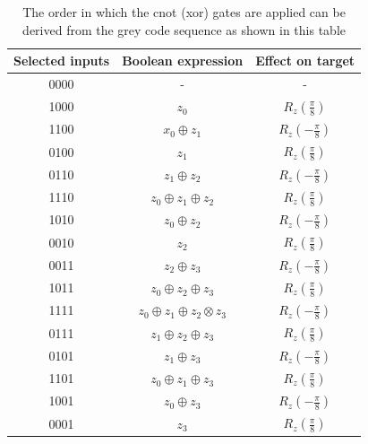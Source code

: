 \documentclass[12pt,a4paper]{article}
\begin{document}
\begin{table}[htbp]
\caption{The order in which the cnot (xor) gates are applied can be derived from the grey code sequence as shown in this table}
\label{table:grey_code_truth}
\begin{center}
\begin{tabular}{|c|c|c|} 
 \hline
 Selected inputs & Boolean expression & Effect on target \\  
 \hline
 0000 & - & - \\ 
 \hline
 1000 & \(z_0\) & \(R_z(\frac{\pi}{8})\) \\
 \hline
 1100 & \(x_0 \oplus z_1\) & \(R_z(-\frac{\pi}{8})\) \\
 \hline
 0100 & \(z_1\) & \(R_z(\frac{\pi}{8})\) \\
 \hline
 0110 & \(z_1 \oplus z_2\) & \(R_z(-\frac{\pi}{8})\) \\
 \hline
 1110 & \(z_0 \oplus z_1 \oplus z_2\) & \(R_z(\frac{\pi}{8})\) \\
 \hline 
 1010 & \(z_0 \oplus z_2\) & \(R_z(-\frac{\pi}{8})\) \\
 \hline 
 0010 & \(z_2\) & \(R_z(\frac{\pi}{8})\) \\
 \hline
 0011 & \(z_2 \oplus z_3\) & \(R_z(-\frac{\pi}{8})\) \\
 \hline
 1011 & \(z_0 \oplus z_2 \oplus z_3\) & \(R_z(\frac{\pi}{8})\) \\
 \hline
 1111 & \(z_0 \oplus z_1 \oplus z_2 \otimes z_3\) & \(R_z(-\frac{\pi}{8})\) \\
 \hline
 0111 & \(z_1 \oplus z_2 \oplus z_3\) & \(R_z(\frac{\pi}{8})\) \\
 \hline
 0101 & \(z_1 \oplus z_3\) & \(R_z(-\frac{\pi}{8})\) \\
 \hline
 1101 & \(z_0 \oplus z_1 \oplus z_3\) & \(R_z(\frac{\pi}{8})\) \\
 \hline 
 1001 & \(z_0 \oplus z_3\) & \(R_z(-\frac{\pi}{8})\) \\
 \hline 
 0001 & \(z_3\) & \(R_z(\frac{\pi}{8})\) \\
 \hline
\end{tabular}
\end{center}
\end{table}
\end{document}
